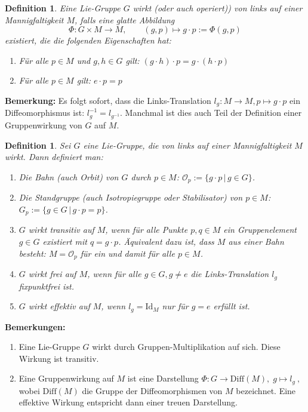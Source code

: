 \documentclass[12pt,a4paper]{article}
\def\Diff{\mathrm{Diff}}
\def\Id{\mathrm{Id}}
\newtheorem{Definition}[Lemma]{Definition}
\begin{document}
\begin{Definition}
Eine Lie-Gruppe $G$ {\em wirkt} (oder auch {\em operiert})) von links
auf einer Mannigfaltigkeit $M$, falls eine glatte Abbildung
$$
\Phi : G \times M \rightarrow M, \qquad (g,p) \mapsto g\cdot p := \Phi(g,p)
$$
existiert, die die folgenden Eigenschaften hat:
\begin{enumerate}
\item
F\"ur alle $p \in M$ und $g, h \in G$ gilt: \qquad $(g\cdot h)\cdot p = g \cdot (h \cdot p)$
\item
F\"ur alle $p \in M$ gilt: \qquad $ e \cdot p = p$
\end{enumerate}
\end{Definition}

\bigskip

{\bf Bemerkung:} Es folgt sofort, dass die Links-Translation $l_g: M \rightarrow M, p\mapsto g\cdot p$
ein Diffeomorphismus ist: $l_g^{-1}= l_{g^{-1}}$. Manchmal ist dies auch Teil der Definition einer
Gruppenwirkung von $G$ auf $M$.

\bigskip

\begin{Definition}
Sei $G$ eine Lie-Gruppe, die von links auf einer Mannigfaltigkeit $M$ wirkt. Dann definiert man:
\begin{enumerate}
\item
Die {\em Bahn} (auch {\em Orbit}) von $G$ durch $p\in M$:   \qquad $\mathcal O_p := \{g\cdot p \,|\, g\in G\}$.
\item
Die {\em Standgruppe} (auch Isotropiegruppe oder Stabilisator) von $p\in M$:
\quad $G_p := \{ g \in G \,|\, g\cdot p = p\}$.
\item
$G$ wirkt {\em transitiv} auf $M$, wenn f\"ur alle Punkte $p, q \in M$ ein Gruppenelement $g\in G$ existiert
mit $q = g \cdot p$. \"Aquivalent dazu ist, dass $M$ aus einer Bahn besteht: $M = \mathcal O_p$ f\"ur ein und
damit f\"ur alle $p\in M$.
\item
$G$ wirkt {\em frei} auf $M$, wenn f\"ur alle $g\in G, g\neq e$ die Links-Translation $l_g$ fixpunktfrei ist.
\item
$G$ wirkt {\em effektiv} auf $M$, wenn $l_g= \Id_M$ nur f\"ur $g=e$ erf\"ullt ist.
\end{enumerate}
\end{Definition}


\bigskip

{\bf Bemerkungen:}
\begin{enumerate}
\item
Eine Lie-Gruppe $G$ wirkt durch Gruppen-Multiplikation auf sich. Diese Wirkung ist transitiv.
\item
Eine Gruppenwirkung auf $M$ ist eine Darstellung
$
\Phi : G \rightarrow \Diff(M), \; g \mapsto l_g \ ,
$
wobei $\Diff(M)$ die Gruppe der Diffeomorphismen von $M$ bezeichnet. Eine effektive Wirkung entspricht dann einer
treuen Darstellung.
\end{enumerate}
\end{document}
